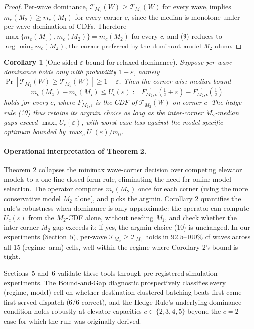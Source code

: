 \documentclass[11pt, a4paper]{article}
\newtheorem{corollary}{Corollary}
\theoremstyle{definition}
\begin{document}
\begin{proof}
Per-wave dominance, $\mathcal{T}_{M_2}(W) \geq \mathcal{T}_{M_1}(W)$ for every wave, implies $m_c(M_2) \geq m_c(M_1)$ for every corner $c$, since the median is monotone under per-wave domination of CDFs. Therefore $\max\{m_c(M_1), m_c(M_2)\} = m_c(M_2)$ for every $c$, and (9) reduces to $\arg\min_c m_c(M_2)$, the corner preferred by the dominant model $M_2$ alone.
\end{proof}

\begin{corollary}[One-sided $\varepsilon$-bound for relaxed dominance]\label{cor:eps}
Suppose per-wave dominance holds only with probability $1 - \varepsilon$, namely $\Pr[\mathcal{T}_{M_2}(W) \geq \mathcal{T}_{M_1}(W)] \geq 1 - \varepsilon$. Then the corner-wise median bound
\begin{equation}\label{eq:eps-bound}\tag{11}
m_c(M_1) - m_c(M_2) \leq U_c(\varepsilon) := F_{M_2,c}^{-1}\!\left(\tfrac{1}{2} + \varepsilon\right) - F_{M_2,c}^{-1}\!\left(\tfrac{1}{2}\right)
\end{equation}
holds for every $c$, where $F_{M_2,c}$ is the CDF of $\mathcal{T}_{M_2}(W)$ on corner $c$. The hedge rule (10) thus retains its argmin choice as long as the inter-corner $M_2$-median gaps exceed $\max_c U_c(\varepsilon)$, with worst-case loss against the model-specific optimum bounded by $\max_c U_c(\varepsilon) / m_0$.
\end{corollary}

\paragraph{Operational interpretation of Theorem 2.} Theorem 2 collapses the minimax wave-corner decision over competing elevator models to a one-line closed-form rule, eliminating the need for online model selection. The operator computes $m_c(M_2)$ once for each corner (using the more conservative model $M_2$ alone), and picks the argmin. Corollary 2 quantifies the rule's robustness when dominance is only approximate: the operator can compute $U_c(\varepsilon)$ from the $M_2$-CDF alone, without needing $M_1$, and check whether the inter-corner $M_2$-gap exceeds it; if yes, the argmin choice (10) is unchanged. In our experiments (Section~5), per-wave $\mathcal{T}_{M_2} \geq \mathcal{T}_{M_1}$ holds in 92.5--100\% of waves across all 15 (regime, arm) cells, well within the regime where Corollary 2's bound is tight.

Sections~5 and~6 validate these tools through pre-registered simulation experiments. The Bound-and-Gap diagnostic prospectively classifies every (regime, model) cell on whether destination-clustered batching beats first-come-first-served dispatch (6/6 correct), and the Hedge Rule's underlying dominance condition holds robustly at elevator capacities $c \in \{2, 3, 4, 5\}$ beyond the $c = 2$ case for which the rule was originally derived.
\end{document}
